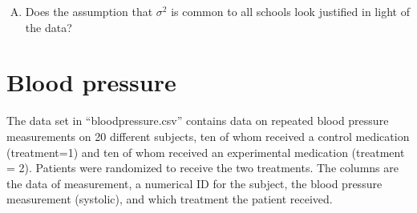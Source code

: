 \documentclass[11pt]{article}
\begin{document}
\begin{enumerate}[(A)]
\item Does the assumption that $\sigma^2$ is common to all schools look justified in light of the data?  

\end{enumerate}


\section{Blood pressure}

The data set in ``bloodpressure.csv'' contains data on repeated blood pressure measurements on 20 different subjects, ten of whom received a control medication (treatment=1) and ten of whom received an experimental medication (treatment = 2).  Patients were randomized to receive the two treatments.  The columns are the data of measurement, a numerical ID for the subject, the blood pressure measurement (systolic), and which treatment the patient received.
\end{document}
